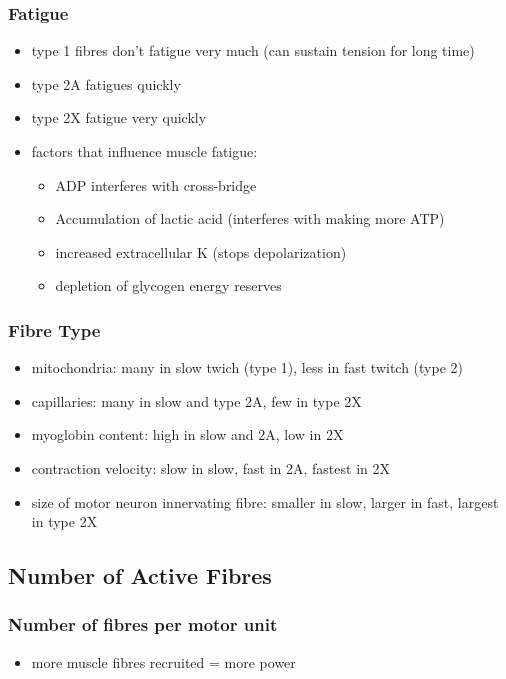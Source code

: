 \documentclass[10pt]{article}
\begin{document}
\subsubsection{Fatigue}
\begin{itemize}
    \item type 1 fibres don't fatigue very much (can sustain tension for long time)
    \item type 2A fatigues quickly
    \item type 2X fatigue very quickly
    \item factors that influence muscle fatigue:
        \begin{itemize}
            \item ADP interferes with cross-bridge
            \item Accumulation of lactic acid (interferes with making more ATP)
            \item increased extracellular K (stops depolarization)
            \item depletion of glycogen energy reserves
        \end{itemize}
\end{itemize}

\subsubsection{Fibre Type}
\begin{itemize}
    \item mitochondria: many in slow twich (type 1), less in fast twitch (type 2)
    \item capillaries: many in slow and type 2A, few in type 2X
    \item myoglobin content: high in slow and 2A, low in 2X
    \item contraction velocity: slow in slow, fast in 2A, fastest in 2X
    \item size of motor neuron innervating fibre: smaller in slow, larger in fast, largest in type 2X
\end{itemize}


\subsection{Number of Active Fibres}
\subsubsection{Number of fibres per motor unit}
\begin{itemize}
    \item more muscle fibres recruited = more power
\end{itemize}
\end{document}
